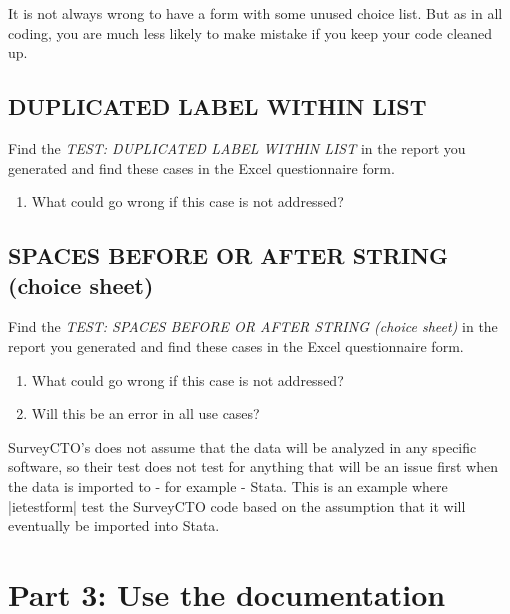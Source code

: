\documentclass{tufte-handout}
\begin{document}
	\noindent It is not always wrong to have a form with some unused choice list. But as in all coding, you are much less likely to make mistake if you keep your code cleaned up.

\subsection{DUPLICATED LABEL WITHIN LIST}
	Find the \textit{TEST: DUPLICATED LABEL WITHIN LIST} in the report you generated and find these cases in the Excel questionnaire form.
	
	\begin{enumerate}
		\item What could go wrong if this case is not addressed?  
	\end{enumerate}

\subsection{SPACES BEFORE OR AFTER STRING (choice sheet)}
	Find the \textit{TEST: SPACES BEFORE OR AFTER STRING (choice sheet)} in the report you generated and find these cases in the Excel questionnaire form.
	
	\begin{enumerate}
		\item What could go wrong if this case is not addressed?   
		\item Will this be an error in all use cases? 
	\end{enumerate}

	SurveyCTO's does not assume that the data will be analyzed in any specific software, so their test does not test for anything that will be an issue first when the data is imported to - for example - Stata. This is an example where |ietestform| test the SurveyCTO code based on the assumption that it will eventually be imported into Stata.

\section{Part 3: Use the documentation}
\end{document}

